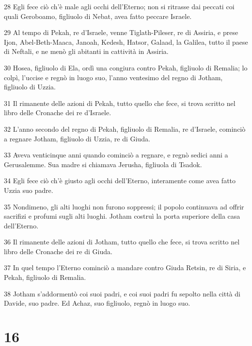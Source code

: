 \par 28 Egli fece ciò ch'è male agli occhi dell'Eterno; non si ritrasse dai peccati coi quali Geroboamo, figliuolo di Nebat, avea fatto peccare Israele.
\par 29 Al tempo di Pekah, re d'Israele, venne Tiglath-Pileser, re di Assiria, e prese Ijon, Abel-Beth-Maaca, Janoah, Kedesh, Hatsor, Galaad, la Galilea, tutto il paese di Neftali, e ne menò gli abitanti in cattività in Assiria.
\par 30 Hosea, figliuolo di Ela, ordì una congiura contro Pekah, figliuolo di Remalia; lo colpì, l'uccise e regnò in luogo suo, l'anno ventesimo del regno di Jotham, figliuolo di Uzzia.
\par 31 Il rimanente delle azioni di Pekah, tutto quello che fece, si trova scritto nel libro delle Cronache dei re d'Israele.
\par 32 L'anno secondo del regno di Pekah, figliuolo di Remalia, re d'Israele, cominciò a regnare Jotham, figliuolo di Uzzia, re di Giuda.
\par 33 Aveva venticinque anni quando cominciò a regnare, e regnò sedici anni a Gerusalemme. Sua madre si chiamava Jerusha, figliuola di Tsadok.
\par 34 Egli fece ciò ch'è giusto agli occhi dell'Eterno, interamente come avea fatto Uzzia suo padre.
\par 35 Nondimeno, gli alti luoghi non furono soppressi; il popolo continuava ad offrir sacrifizi e profumi sugli alti luoghi. Jotham costruì la porta superiore della casa dell'Eterno.
\par 36 Il rimanente delle azioni di Jotham, tutto quello che fece, si trova scritto nel libro delle Cronache dei re di Giuda.
\par 37 In quel tempo l'Eterno cominciò a mandare contro Giuda Retsin, re di Siria, e Pekah, figliuolo di Remalia.
\par 38 Jotham s'addormentò coi suoi padri, e coi suoi padri fu sepolto nella città di Davide, suo padre. Ed Achaz, suo figliuolo, regnò in luogo suo.

\chapter{16}

